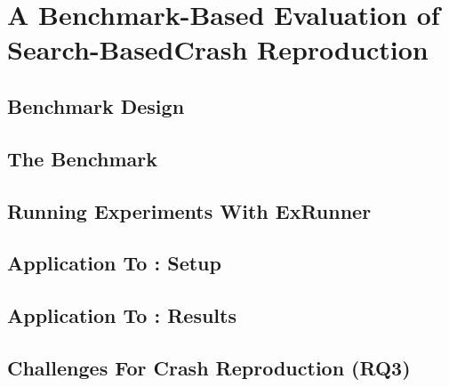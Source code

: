 \chapter{A Benchmark-Based Evaluation of Search-BasedCrash Reproduction}

\label{sec:jcrashpack:introduction}




% 

\section{Benchmark Design}
\label{sec:jcrashpack:benchmarkdesign}


\section{The \crashpack Benchmark}
\label{sec:jcrashpack:benchmark}


\section{Running Experiments With ExRunner}
\label{sec:jcrashpack:ExRunner}


\section{Application To \evocrash: Setup}
\label{sec:jcrashpack:evocrashevalsetup}


\section{Application To \evocrash: Results}
\label{sec:jcrashpack:evocrashevalresults}


\section{Challenges For Crash Reproduction (RQ3)}
\label{sec:jcrashpack:challenges}


